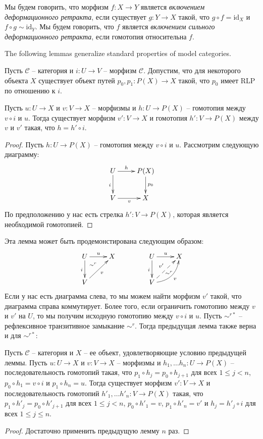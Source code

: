 \documentclass[reqno]{amsart}
\theoremstyle{definition}
\theoremstyle{remark}
\newcommand{\cat}[1]{\mathcal{#1}}
\renewcommand{\C}{\cat{C}}
\newcommand{\fs}[1]{\mathrm{#1}}
\begin{document}
\begin{defn}
Мы будем говорить, что морфизм $f : X \to Y$ является \emph{включением деформационного ретракта}, если существует $g : Y \to X$ такой, что $g \circ f = \fs{id}_X$ и $f \circ g \sim \fs{id}_Y$.
Мы будем говорить, что $f$ является \emph{включением сильного деформационного ретракта}, если гомотопия относительна $f$.
\end{defn}

The following lemmas generalize standard properties of model categories.

\begin{lem}
Пусть $\C$ -- категория и $i : U \to V$ -- морфизм $\C$.
Допустим, что для некоторого объекта $X$ существует объект путей $p_0,p_1 : P(X) \to X$ такой, что $p_0$ имеет RLP по отношению к $i$.

Пусть $u : U \to X$ и $v : V \to X$ -- морфизмы и $h : U \to P(X)$ -- гомотопия между $v \circ i$ и $u$.
Тогда существует морфизм $v' : V \to X$ и гомотопия $h' : V \to P(X)$ между $v$ и $v'$ такая, что $h = h' \circ i$.
\end{lem}
\begin{proof}
Пусть $h : U \to P(X)$ -- гомотопия между $v \circ i$ и $u$.
Рассмотрим следующую диаграмму:
\[ \xymatrix{ U \ar[r]^-h \ar[d]_i & P(X) \ar[d]^{p_0} \\
              V \ar[r]_v & X
            } \]
По предположению у нас есть стрелка $h' : V \to P(X)$, которая является необходимой гомотопией.
\end{proof}

Эта лемма может быть продемонстирована следующим образом:
\[ \xymatrix{ U \ar[r]^u \ar[d]_i \ar@{}[dr]|(.3){\sim^r} & X \\
              V \ar[ur]_v &
            }
\qquad \qquad
   \xymatrix{ U \ar[r]^u \ar[d]_i \ar@{}[dr]|(.62){\sim^r} & X \\
              V \ar@{-->}[ur]^{v'} \ar@/_1pc/[ur]_v &
            } \]
Если у нас есть диаграмма слева, то мы можем найти морфизм $v'$ такой, что диаграмма справа коммутирует.
Более того, если ограничить гомотопию между $v$ и $v'$ на $U$, то мы получим исходную гомотопию между $v \circ i$ и $u$.
Пусть $\sim^{r*}$ -- рефлексивное транзитивное замыкание $\sim^r$.
Тогда предыдущая лемма также верна и для $\sim^{r*}$:

\begin{lem}
Пусть $\C$ -- категория и $X$ -- ее объект, удовлетворяющие условию предыдущей леммы.
Пусть $u : U \to X$ и $v : V \to X$ -- морфизмы и $h_1, \ldots h_n : U \to P(X)$ -- последовательность гомотопий такая, что $p_1 \circ h_j = p_0 \circ h_{j+1}$ для всех $1 \leq j < n$, $p_0 \circ h_1 = v \circ i$ и $p_1 \circ h_n = u$.
Тогда существует морфизм $v' : V \to X$ и последовательность гомотопий $h'_1, \ldots h'_n : V \to P(X)$ такая,
что $p_1 \circ h'_j = p_0 \circ h'_{j+1}$ для всех $1 \leq j < n$, $p_0 \circ h'_1 = v$, $p_1 \circ h'_n = v'$ и $h_j = h'_j \circ i$ для всех $1 \leq j \leq n$.
\end{lem}
\begin{proof}
Достаточно применить предыдущую лемму $n$ раз.
\end{proof}
\end{document}
